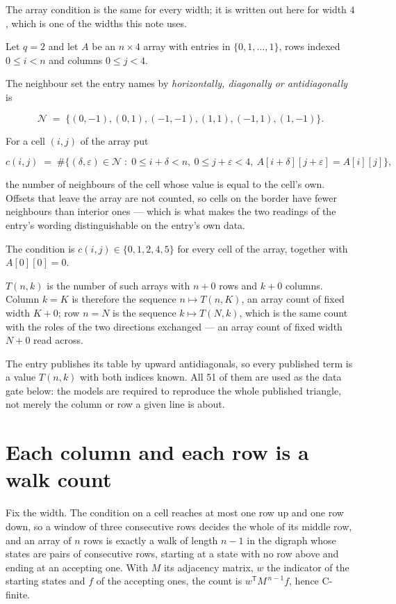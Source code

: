 \documentclass[11pt]{article}
\theoremstyle{definition}
\begin{document}
The array condition is the same for every width; it is written out here for width $4$, which is one of the widths this note uses.

Let $q = 2$ and let $A$ be an $n \times 4$ array with entries in $\{0,1,\dots,1\}$, rows indexed $0 \le i < n$ and columns $0 \le j < 4$.

The neighbour set the entry names by {\itshape horizontally, diagonally or antidiagonally} is

\[\mathcal{N} \;=\; \{(0,-1), (0,1), (-1,-1), (1,1), (-1,1), (1,-1)\}.\]

For a cell $(i,j)$ of the array put

\[c(i,j) \;=\; \#\bigl\{(\delta,\varepsilon)\in\mathcal{N} \;:\; 0\le i+\delta<n,\ 0\le j+\varepsilon<4,\ A[i+\delta][j+\varepsilon] = A[i][j]\bigr\},\]

the number of neighbours of the cell whose value is equal to the cell's own. Offsets that leave the array are not counted, so cells on the border have fewer neighbours than interior ones --- which is what makes the two readings of the entry's wording distinguishable on the entry's own data.

The condition is $c(i,j) \in \{0, 1, 2, 4, 5\}$ for every cell of the array, together with $A[0][0]=0$.

$T(n,k)$ is the number of such arrays with $n + 0$ rows and $k + 0$ columns. Column $k = K$ is therefore the sequence $n \mapsto T(n,K)$, an array count of fixed width $K + 0$; row $n = N$ is the sequence $k \mapsto T(N,k)$, which is the same count with the roles of the two directions exchanged --- an array count of fixed width $N + 0$ read across.

The entry publishes its table by upward antidiagonals, so every published term is a value $T(n,k)$ with both indices known. All 51 of them are used as the data gate below: the models are required to reproduce the whole published triangle, not merely the column or row a given line is about.

\section{Each column and each row is a walk count}

Fix the width. The condition on a cell reaches at most one row up and one row down, so a window of three consecutive rows decides the whole of its middle row, and an array of $n$ rows is exactly a walk of length $n-1$ in the digraph whose states are pairs of consecutive rows, starting at a state with no row above and ending at an accepting one. With $M$ its adjacency matrix, $w$ the indicator of the starting states and $f$ of the accepting ones, the count is $w^{\mathsf T}M^{\,n-1}f$, hence C-finite.
\end{document}

